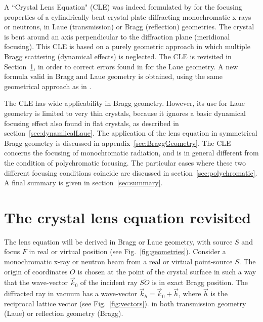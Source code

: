 \documentclass[preprint]{iucr}              %
\newcommand{\inred}[1]{{\color{red}#1}}
\begin{document}

A ``Crystal Lens Equation" (CLE) was indeed formulated by \cite{CK} for the focusing properties of a cylindrically bent crystal plate diffracting monochromatic x-rays or neutrons, in Laue (transmission) or Bragg (reflection) geometries. The crystal is bent around an axis perpendicular to the diffraction plane (meridional focusing). This CLE is based on a purely geometric approach in which multiple \inred{Bragg} scattering (dynamical effects) \inred{is neglected}. 
The CLE is \inred{revisited} in Section~\ref{sec:CLE}, \inred{in order to correct errors} found in \cite{CK} for the Laue geometry. \inred{A new formula valid in Bragg and Laue geometry is obtained, using the same geometrical approach as in \cite{CK}}.

The CLE has wide applicability in Bragg geometry. However, \inred{its use for Laue geometry} is \inred{limited to very thin crystals, because
it ignores} a \inred{basic} dynamical focusing effect \inred{also found in flat crystals},
as described in section~\ref{sec:dynamlicalLaue}. 
The application of the lens equation in symmetrical Bragg geometry is discussed in \inred{appendix}~\ref{sec:BraggGeometry}. %
The CLE concerns the focusing of monochromatic radiation, and is in general different from the condition of polychromatic focusing. The particular cases where these two different focusing conditions coincide are discussed in section~\ref{sec:polychromatic}. A final summary is given in section~\ref{sec:summary}.   


\section{The crystal lens equation revisited}
\label{sec:CLE}

\inred{The lens equation will be derived in Bragg or Laue geometry, with source $S$ and focus $F$ in real or virtual position (see Fig.~\ref{fig:geometries}).} Consider a monochromatic x-ray or neutron beam \inred{from a real or virtual} point-source $S$. The origin of coordinates $O$ is chosen at the point of the crystal surface in such a way that the wave-vector  ${\vec k_0}$ of the incident ray $\overline{SO}$ is in exact Bragg  position. The diffracted ray \inred{in vacuum} has a wave-vector 
$\vec k_h = \vec k_0 + \vec h$, where $\vec h$ is the reciprocal lattice vector (see Fig.~\ref{fig:vectors}).
\inred{in} both transmission geometry (Laue) or reflection geometry (Bragg).
\end{document}
